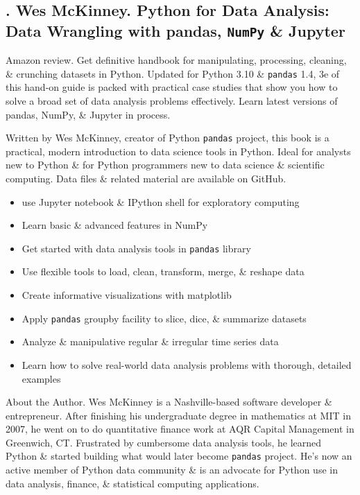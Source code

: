 \documentclass{article}
\begin{document}

\subsection{\cite{McKinney2022}. {\sc Wes McKinney}. Python for Data Analysis: Data Wrangling with pandas, {\tt NumPy} \& Jupyter}
{}

{\sf Amazon review.} Get definitive handbook for manipulating, processing, cleaning, \& crunching datasets in Python. Updated for Python 3.10 \& {\tt pandas} 1.4, 3e of this hand-on guide is packed with practical case studies that show you how to solve a broad set of data analysis problems effectively. Learn latest versions of pandas, NumPy, \& Jupyter in process.

Written by {\sc Wes McKinney}, creator of Python {\tt pandas} project, this book is a practical, modern introduction to data science tools in Python. Ideal for analysts new to Python \& for Python programmers new to data science \& scientific computing. Data files \& related material are available on GitHub.
\begin{itemize}
	\item use Jupyter notebook \& IPython shell for exploratory computing
	\item Learn basic \& advanced features in NumPy
	\item Get started with data analysis tools in {\tt pandas} library
	\item Use flexible tools to load, clean, transform, merge, \& reshape data
	\item Create informative visualizations with matplotlib
	\item Apply {\tt pandas} groupby facility to slice, dice, \& summarize datasets
	\item Analyze \& manipulative regular \& irregular time series data
	\item Learn how to solve real-world data analysis problems with thorough, detailed examples
\end{itemize}
{\sf About the Author.} {\sc Wes McKinney} is a Nashville-based software developer \& entrepreneur. After finishing his undergraduate degree in mathematics at MIT in 2007, he went on to do quantitative finance work at AQR Capital Management in Greenwich, CT. Frustrated by cumbersome data analysis tools, he learned Python \& started building what would later become {\tt pandas} project. He's now an active member of Python data community \& is an advocate for Python use in data analysis, finance, \& statistical computing applications.
\end{document}
